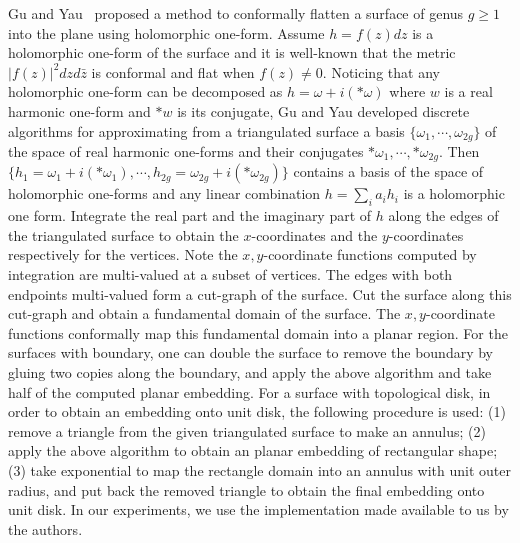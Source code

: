 \documentclass[11pt]{article}
\begin{document}
\vspace{0.1in}
Gu and Yau~\cite{Gu:2003} proposed a method to conformally flatten a surface of 
genus $g\geq 1$ into the plane using holomorphic one-form. Assume $h=f(z)dz$ is a 
holomorphic one-form of the surface and it is well-known that the metric 
$|f(z)|^2 dz d\bar{z}$ is conformal and flat when $f(z) \neq 0$. Noticing that 
any holomorphic one-form can be decomposed as $h = \omega + i(*\omega)$
where $w$ is a real harmonic one-form and $*w$ is its conjugate, Gu and Yau 
developed discrete algorithms for approximating from a triangulated surface
a basis $\{\omega_1, \cdots, \omega_{2g}\}$ of the space of real harmonic one-forms
and their conjugates ${*\omega_1, \cdots, *\omega_{2g}}$. Then 
$\{h_1=\omega_1 + i(*\omega_1), \cdots, h_{2g}=\omega_{2g} + i(*\omega_{2g})\}$ 
contains a basis of the space of holomorphic one-forms and any linear combination
$h=\sum_i a_i h_i$ is a holomorphic one form. Integrate the real part 
and the imaginary part of $h$ along the edges of the triangulated surface to
obtain the $x$-coordinates and the $y$-coordinates  respectively for the vertices. 
Note the $x, y$-coordinate functions computed by integration are multi-valued 
at a subset of vertices. The edges with both endpoints multi-valued form a cut-graph 
of the surface. Cut the surface along this cut-graph and obtain a fundamental domain 
of the surface. The $x, y$-coordinate functions conformally map this fundamental domain 
into a planar region. For the surfaces with boundary, one can double the surface to remove
the boundary by gluing two copies along the boundary, and apply the above algorithm and 
take half of the computed planar embedding. For a surface with topological disk, in order
to obtain an embedding onto unit disk, the following procedure is used: (1) remove a triangle
from the given triangulated surface to make an annulus; (2) apply the above algorithm to 
obtain an planar embedding of rectangular shape; (3) take exponential to map the rectangle domain
into an annulus with unit outer radius, and put back the removed triangle to obtain the final embedding
onto unit disk.  
In our experiments, we use the implementation made available to us by the authors. 
\end{document}

